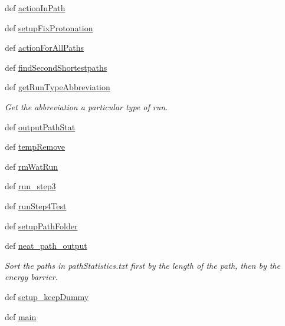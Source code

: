 \begin{DoxyCompactItemize}
\item 
def \hyperlink{namespacehydro__s4_aa88aac35fc376c05435adce43d0938fd}{action\-In\-Path}
\item 
def \hyperlink{namespacehydro__s4_a68fc4b438f6095ad08fdb06a1d9b3868}{setup\-Fix\-Protonation}
\item 
def \hyperlink{namespacehydro__s4_a9d4af53792d4d88b5179e995576e8b64}{action\-For\-All\-Paths}
\item 
def \hyperlink{namespacehydro__s4_a55a19becd59945a40eeae54b99c2390b}{find\-Second\-Shortestpaths}
\item 
def \hyperlink{namespacehydro__s4_a7566c8113cec1e9cd44ca936cee6df8b}{get\-Run\-Type\-Abbreviation}
\begin{DoxyCompactList}\small\item\em Get the abbreviation a particular type of run. \end{DoxyCompactList}\item 
def \hyperlink{namespacehydro__s4_acf908e66e012c1045239b4cebbec56ae}{output\-Path\-Stat}
\item 
def \hyperlink{namespacehydro__s4_ac39a07ee276862fd05ab79ba6733ff53}{temp\-Remove}
\item 
def \hyperlink{namespacehydro__s4_a6e12853eb2be95cab57f94618440c788}{rm\-Wat\-Run}
\item 
def \hyperlink{namespacehydro__s4_a4f824cb694882c2d669e7f5b62584d20}{run\-\_\-step3}
\item 
def \hyperlink{namespacehydro__s4_a8d93fcbe33f95921a53d944e80cec9f7}{run\-Step4\-Test}
\item 
def \hyperlink{namespacehydro__s4_af8fd5157bc65a599df8bdfc53ad77118}{setup\-Path\-Folder}
\item 
def \hyperlink{namespacehydro__s4_a7dca440de404b32725bba55335ef7f0c}{neat\-\_\-path\-\_\-output}
\begin{DoxyCompactList}\small\item\em Sort the paths in path\-Statistics.\-txt first by the length of the path, then by the energy barrier. \end{DoxyCompactList}\item 
def \hyperlink{namespacehydro__s4_a9d4ba9bbd2ce6adae8fc8915e49a7aec}{setup\-\_\-keep\-Dummy}
\item 
def \hyperlink{namespacehydro__s4_a9eefa859791720d5765c10c3dea67fea}{main}
\end{DoxyCompactItemize}
